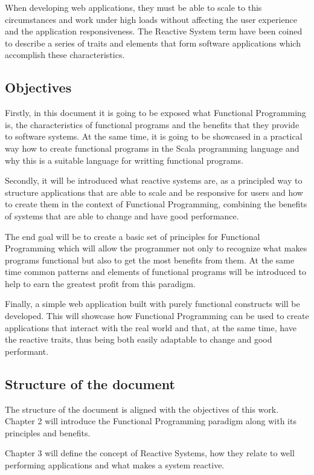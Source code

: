 \documentclass[../main.tex]{subfiles}
\begin{document}
When developing web applications, they must be able to scale to this
circumstances and work under high loads without affecting the user experience
and the application responsiveness. The Reactive System term have been coined to
describe a series of traits and elements that form software applications which
accomplish these characteristics.

\subsection{Objectives}
Firstly, in this document it is going to be exposed what Functional
Programming is, the characteristics of functional programs and the benefits that
they provide to software systems. At the same time, it is going to be showcased
in a practical way how to create functional programs in the Scala programming
language\autocite{Scala} and why this is a suitable language for writting functional programs.

Secondly, it will be introduced what reactive systems are, as a principled way to
structure applications that are able to scale and be responsive for users and how to
create them in the context of Functional Programming, combining the benefits of
systems that are able to change and have good performance.

The end goal will be to create a basic set of principles for Functional
Programming which will allow the programmer not only to recognize what makes
programs functional but also to get the most benefits from them. At the same time common
patterns and elements of functional programs will be introduced to help to earn the
greatest profit from this paradigm.

Finally, a simple web application built with purely functional constructs will be
developed. This will showcase how Functional Programming can be used to create
applications that interact with the real world and that, at the same time, have
the reactive traits, thus being both easily adaptable to change and good performant.

\subsection{Structure of the document}
The structure of the document is aligned with the objectives of this work. Chapter 2
will introduce the Functional Programming paradigm along with its principles and
benefits.

Chapter 3 will define the concept of Reactive Systems, how they relate to
well performing applications and what makes a system reactive.
\end{document}
